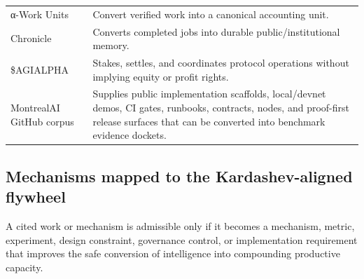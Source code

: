 \begin{longtable}[]{@{}
  >{\raggedright\arraybackslash}p{}
  >{\raggedright\arraybackslash}p{}@{}}
α-Work Units & Convert verified work into a canonical accounting
unit. \\
Chronicle & Converts completed jobs into durable public/institutional
memory. \\
\$AGIALPHA & Stakes, settles, and coordinates protocol operations
without implying equity or profit rights. \\
MontrealAI GitHub corpus & Supplies public implementation scaffolds,
local/devnet demos, CI gates, runbooks, contracts, nodes, and
proof-first release surfaces that can be converted into benchmark
evidence dockets. \\
\end{longtable}

\subsection{Mechanisms mapped to the Kardashev-aligned
flywheel}\label{mechanisms-mapped-to-the-kardashev-aligned-flywheel}

A cited work or mechanism is admissible only if it becomes a mechanism,
metric, experiment, design constraint, governance control, or
implementation requirement that improves the safe conversion of
intelligence into compounding productive capacity.

